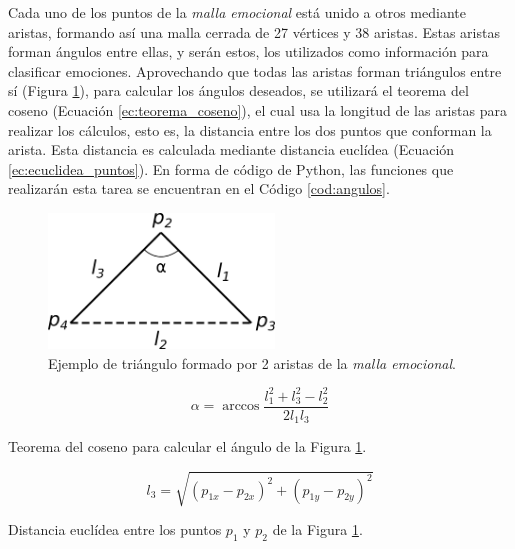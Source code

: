 Cada uno de los puntos de la \textit{malla emocional} está unido a otros mediante aristas, formando así una malla cerrada de 27 vértices y 38 aristas. Estas aristas forman ángulos entre ellas, y serán estos, los utilizados como información para clasificar emociones. Aprovechando que todas las aristas forman triángulos entre sí (Figura \ref{fig:triangulo}), para calcular los ángulos deseados, se utilizará el teorema del coseno (Ecuación \ref{ec:teorema_coseno}), el cual usa la longitud de las aristas para realizar los cálculos, esto es, la distancia entre los dos puntos que conforman la arista. Esta distancia es calculada mediante distancia euclídea (Ecuación \ref{ec:ecuclidea_puntos}). En forma de código de Python, las funciones que realizarán esta tarea se encuentran en el Código \ref{cod:angulos}.

\begin{figure} [h!]
  \begin{center}
    \includegraphics[width=6cm]{figs/triangulo.png}
  \end{center}
  \captionsetup{justification=centering}
  \caption{Ejemplo de triángulo formado por 2 aristas de la \textit{malla emocional}.}
  \label{fig:triangulo}
\end{figure}

\begin{myequation}[h]
\begin{equation}
\alpha = \arccos{\frac{l_{1}^{2}+l_{3}^{2}-l_{2}^{2}}{2l_{1}l_{3}}}
\nonumber
\label{ec:teorema_coseno}
\end{equation}
\captionsetup{justification=centering}
\caption[Teorema del coseno para calcular el ángulo de la Figura \ref{fig:triangulo}.]{Teorema del coseno para calcular el ángulo de la Figura \ref{fig:triangulo}.}
\end{myequation} 

\begin{myequation}[h]
\begin{equation}
l_{3} = \sqrt{(p_{1x}-p_{2x})^{2}+(p_{1y}-p_{2y})^{2}}
\nonumber
\label{ec:ecuclidea_puntos}
\end{equation}
\captionsetup{justification=centering}
\caption[Distancia euclídea entre los puntos $p_{1}$ y $p_{2}$ de la Figura \ref{fig:triangulo}.]{Distancia euclídea entre los puntos $p_{1}$ y $p_{2}$ de la Figura \ref{fig:triangulo}.}
\end{myequation} 

